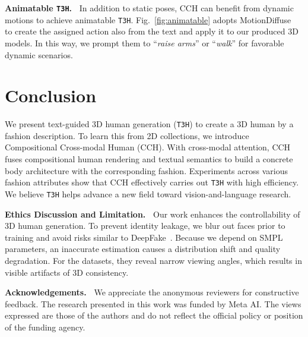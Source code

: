 \documentclass[11pt]{article}
\begin{document}
\vspace{1ex} \noindent \textbf{Animatable \texttt{T3H}.~}
In addition to static poses, CCH can benefit from dynamic motions to achieve animatable \texttt{T3H}. Fig.~\ref{fig:animatable} adopts MotionDiffuse~\cite{zhang2022motion-diffuse} to create the assigned action also from the text and apply it to our produced 3D models. In this way, we prompt them to ``\textit{raise arms}'' or ``\textit{walk}'' for favorable dynamic scenarios.

\section{Conclusion}
We present text-guided 3D human generation (\texttt{T3H}) to create a 3D human by a fashion description. To learn this from 2D collections, we introduce Compositional Cross-modal Human (CCH). With cross-modal attention, CCH fuses compositional human rendering and textual semantics to build a concrete body architecture with the corresponding fashion. Experiments across various fashion attributes show that CCH effectively carries out \texttt{T3H} with high efficiency. We believe \texttt{T3H} helps advance a new field toward vision-and-language research.

\vspace{1ex} \noindent \textbf{Ethics Discussion and Limitation.~} Our work enhances the controllability of 3D human generation. To prevent identity leakage, we blur out faces prior to training and avoid risks similar to DeepFake~\cite{korshunov2018deep-fake}. Because we depend on SMPL parameters, an inaccurate estimation causes a distribution shift and quality degradation. For the datasets, they reveal narrow viewing angles, which results in visible artifacts of 3D consistency. 

\vspace{1ex} \noindent \textbf{Acknowledgements.~}
We appreciate the anonymous reviewers for constructive feedback. The research presented in this work was funded by Meta AI. The views expressed are those of the authors and do not reflect the official policy or position of the funding
agency.



\end{document}
